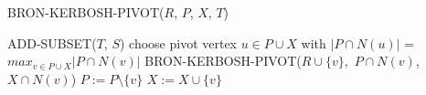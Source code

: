 \begin{algorithm}[H]
    \caption{BRON-KERBOSH-PIVOT($R$, $P$, $X$, $T$)}\label{alg:bk2}
    \begin{algorithmic}[1]
            \State ADD-SUBSET($T$, $S$) 
        \Else
            \State choose pivot vertex $u\in P\cup X$ with $|P\cap N(u)|$ = $max_{v\in P\cup X}|P\cap N(v)|$
                \State BRON-KERBOSH-PIVOT($R\cup \{v\},$ $P\cap N(v)$, $X\cap N(v)$)
                \State $P:=P\setminus \{v\}$
                \State $X:=X\cup \{v\}$
            \EndFor
        \EndIf
    \end{algorithmic}
\end{algorithm}